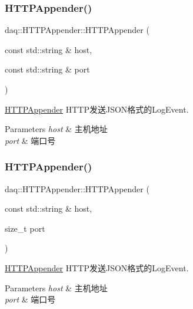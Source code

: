 \subsubsection{\texorpdfstring{H\+T\+T\+P\+Appender()}{HTTPAppender()}\hspace{0.1cm}{\footnotesize\ttfamily [1/2]}}
{\footnotesize\ttfamily daq\+::\+H\+T\+T\+P\+Appender\+::\+H\+T\+T\+P\+Appender (\begin{DoxyParamCaption}\item[{const std\+::string \&}]{host,  }\item[{const std\+::string \&}]{port }\end{DoxyParamCaption})}



\hyperlink{classdaq_1_1HTTPAppender}{H\+T\+T\+P\+Appender} H\+T\+T\+P发送\+J\+S\+O\+N格式的\+Log\+Event. 


\begin{DoxyParams}{Parameters}
{\em host} & 主机地址 \\
\hline
{\em port} & 端口号 \\
\hline
\end{DoxyParams}
\mbox{\label{classdaq_1_1HTTPAppender_ac2c72846193984eb6720ea20e300ab03}} 
\subsubsection{\texorpdfstring{H\+T\+T\+P\+Appender()}{HTTPAppender()}\hspace{0.1cm}{\footnotesize\ttfamily [2/2]}}
{\footnotesize\ttfamily daq\+::\+H\+T\+T\+P\+Appender\+::\+H\+T\+T\+P\+Appender (\begin{DoxyParamCaption}\item[{const std\+::string \&}]{host,  }\item[{size\+\_\+t}]{port }\end{DoxyParamCaption})}



\hyperlink{classdaq_1_1HTTPAppender}{H\+T\+T\+P\+Appender} H\+T\+T\+P发送\+J\+S\+O\+N格式的\+Log\+Event. 


\begin{DoxyParams}{Parameters}
{\em host} & 主机地址 \\
\hline
{\em port} & 端口号 \\
\hline
\end{DoxyParams}


